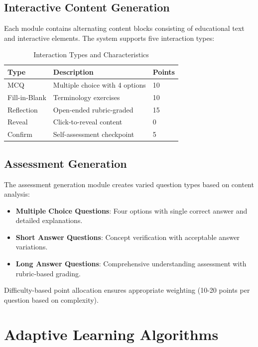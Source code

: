 \documentclass[conference]{IEEEtran}
\begin{document}
\subsection{Interactive Content Generation}

Each module contains alternating content blocks consisting of educational text and interactive elements. The system supports five interaction types:

\begin{table}[htbp]
\caption{Interaction Types and Characteristics}
\begin{center}
\begin{tabular}{|p{1.8cm}|p{3cm}|p{1.5cm}|}
\hline
\textbf{Type} & \textbf{Description} & \textbf{Points} \\
\hline
MCQ & Multiple choice with 4 options & 10 \\
\hline
Fill-in-Blank & Terminology exercises & 10 \\
\hline
Reflection & Open-ended rubric-graded & 15 \\
\hline
Reveal & Click-to-reveal content & 0 \\
\hline
Confirm & Self-assessment checkpoint & 5 \\
\hline
\end{tabular}
\label{tab:interactions}
\end{center}
\end{table}

\subsection{Assessment Generation}

The assessment generation module creates varied question types based on content analysis:

\begin{itemize}
    \item \textbf{Multiple Choice Questions}: Four options with single correct answer and detailed explanations.
    \item \textbf{Short Answer Questions}: Concept verification with acceptable answer variations.
    \item \textbf{Long Answer Questions}: Comprehensive understanding assessment with rubric-based grading.
\end{itemize}

Difficulty-based point allocation ensures appropriate weighting (10-20 points per question based on complexity).

\section{Adaptive Learning Algorithms}
\end{document}
